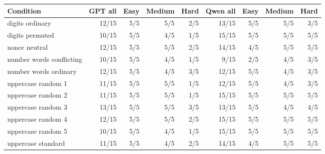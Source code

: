 \begin{tabular}{p{4.4cm}rrrrrrrr}
\toprule
Condition & GPT all & Easy & Medium & Hard & Qwen all & Easy & Medium & Hard\\
\midrule
digits ordinary & 12/15 & 5/5 & 5/5 & 2/5 & 13/15 & 5/5 & 5/5 & 3/5\\
digits permuted & 10/15 & 5/5 & 4/5 & 1/5 & 15/15 & 5/5 & 5/5 & 5/5\\
nonce neutral & 12/15 & 5/5 & 5/5 & 2/5 & 14/15 & 4/5 & 5/5 & 5/5\\
number words conflicting & 10/15 & 5/5 & 4/5 & 1/5 & 9/15 & 2/5 & 4/5 & 3/5\\
number words ordinary & 12/15 & 5/5 & 4/5 & 3/5 & 12/15 & 5/5 & 4/5 & 3/5\\
uppercase random 1 & 11/15 & 5/5 & 5/5 & 1/5 & 12/15 & 5/5 & 4/5 & 3/5\\
uppercase random 2 & 11/15 & 5/5 & 5/5 & 1/5 & 15/15 & 5/5 & 5/5 & 5/5\\
uppercase random 3 & 13/15 & 5/5 & 5/5 & 3/5 & 13/15 & 5/5 & 4/5 & 4/5\\
uppercase random 4 & 12/15 & 5/5 & 5/5 & 2/5 & 15/15 & 5/5 & 5/5 & 5/5\\
uppercase random 5 & 10/15 & 5/5 & 4/5 & 1/5 & 15/15 & 5/5 & 5/5 & 5/5\\
uppercase standard & 11/15 & 5/5 & 4/5 & 2/5 & 14/15 & 4/5 & 5/5 & 5/5\\
\bottomrule
\end{tabular}
